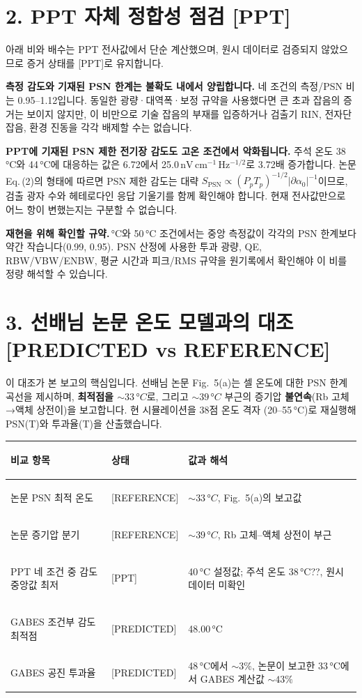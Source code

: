 \documentclass[10pt,a4paper]{article}
\newcommand{\Status}[1]{\textsf{\footnotesize[#1]}}
\newcommand{\sensunit}{\mathrm{nV\,cm^{-1}\,Hz^{-1/2}}}
\newcommand{\warnbox}[1]{%
  \noindent\colorbox{warn}{%
    \parbox{\dimexpr\textwidth-2\fboxsep\relax}{#1}}}
\providecommand{\SensitivityOptimumTemperatureC}{48.00}
\providecommand{\GabesOptimumTransmissionPct}{3}
\providecommand{\PaperPSNOptimumC}{33}
\providecommand{\PaperOptimumTransmissionPct}{43}
\begin{document}
\section*{2. PPT 자체 정합성 점검 \Status{PPT}}

아래 비와 배수는 PPT 전사값에서 단순 계산했으며, 원시 데이터로 검증되지 않았으므로 증거 상태를
\Status{PPT}로 유지합니다.

\textbf{측정 감도와 기재된 PSN 한계는 불확도 내에서 양립합니다.} 네 조건의 측정/PSN 비는
0.95--1.12입니다. 동일한 광량·대역폭·보정 규약을 사용했다면 큰 초과 잡음의 증거는 보이지 않지만,
이 비만으로 기술 잡음의 부재를 입증하거나 검출기 RIN, 전자단 잡음, 환경 진동을 각각 배제할 수는 없습니다.

\textbf{PPT에 기재된 PSN 제한 전기장 감도도 고온 조건에서 악화됩니다.} 주석 온도 38\,°C와 44\,°C에
대응하는 값은 6.72에서 25.0\,\(\sensunit\)로 3.72배 증가합니다. 논문 Eq.\,(2)의 형태에 따르면
PSN 제한 감도는 대략 \(S_{\mathrm{PSN}}\propto(P_pT_p)^{-1/2}|\partial\alpha_0|^{-1}\)이므로,
검출 광자 수와 헤테로다인 응답 기울기를 함께 확인해야 합니다. 현재 전사값만으로 어느 항이 변했는지는
구분할 수 없습니다.

\warnbox{\small\textbf{재현을 위해 확인할 규약.}\,°C와 50\,°C 조건에서는 중앙 측정값이
각각의 PSN 한계보다 약간 작습니다(0.99, 0.95). PSN 산정에 사용한 투과 광량, QE, RBW/VBW/ENBW,
평균 시간과 피크/RMS 규약을 원기록에서 확인해야 이 비를 정량 해석할 수 있습니다.}

\section*{3. 선배님 논문 온도 모델과의 대조 \Status{PREDICTED vs REFERENCE}}

이 대조가 본 보고의 핵심입니다. 선배님 논문 Fig.\ 5(a)는 셀 온도에 대한 PSN 한계 곡선을
제시하며, \textbf{최적점을 \(\sim\PaperPSNOptimumC\,°C\)}로, 그리고 \(\sim39\,°C\) 부근의 증기압
\textbf{불연속}(Rb 고체→액체 상전이)을 보고합니다. 현 시뮬레이션을 38점 온도 격자
(20--55\,°C)로 재실행해 PSN(T)와 투과율(T)을 산출했습니다.

\begin{tabularx}{\textwidth}{>{\bfseries\raggedright\arraybackslash}p{4.15cm}p{2.0cm}X}
\toprule
비교 항목 & 상태 & 값과 해석\\
\midrule
논문 PSN 최적 온도 & \Status{REFERENCE} & \(\sim\PaperPSNOptimumC\,°C\), Fig.\ 5(a)의 보고값\\
논문 증기압 분기 & \Status{REFERENCE} & \(\sim39\,°C\), Rb 고체--액체 상전이 부근\\
PPT 네 조건 중 감도 중앙값 최저 & \Status{PPT} & 40\,°C 설정값; 주석 온도 38\,°C??, 원시 데이터 미확인\\
GABES 조건부 감도 최적점 & \Status{PREDICTED} & \SensitivityOptimumTemperatureC\,°C\\
GABES 공진 투과율 & \Status{PREDICTED} & 48\,°C에서 \(\sim\GabesOptimumTransmissionPct\%\),
논문이 보고한 33\,°C에서 GABES 계산값 \(\sim\PaperOptimumTransmissionPct\%\)\\
\bottomrule
\end{tabularx}
\end{document}
